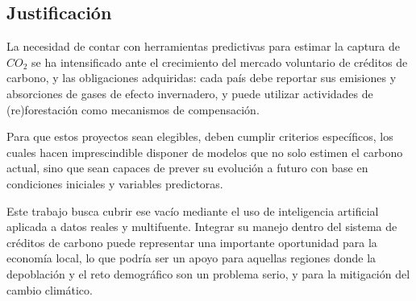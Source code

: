 \subsection{Justificación}

La necesidad de contar con herramientas predictivas para estimar la captura de \(CO_2\) se ha intensificado ante el crecimiento del mercado voluntario de créditos de carbono, y las obligaciones adquiridas: cada país debe reportar sus emisiones y absorciones de gases de efecto invernadero, y puede utilizar actividades de (re)forestación como mecanismos de compensación.

Para que estos proyectos sean elegibles, deben cumplir criterios específicos, los cuales hacen imprescindible disponer de modelos que no solo estimen el carbono actual, sino que sean capaces de prever su evolución a futuro con base en condiciones iniciales y variables predictoras.

Este trabajo busca cubrir ese vacío mediante el uso de inteligencia artificial aplicada a datos reales y multifuente. Integrar su manejo dentro del sistema de créditos de carbono puede representar una importante oportunidad para la economía local, lo que podría ser un apoyo para aquellas regiones donde la depoblación y el reto demográfico son un problema serio, y para la mitigación del cambio climático.

